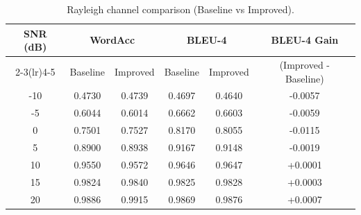 \begin{table}[htbp]
\centering
\caption{Rayleigh channel comparison (Baseline vs Improved).}
\begin{tabular}{cccccc}
\toprule
SNR (dB) & \multicolumn{2}{c}{WordAcc} & \multicolumn{2}{c}{BLEU-4} & BLEU-4 Gain \\
\cmidrule(lr){2-3}\cmidrule(lr){4-5}
& Baseline & Improved & Baseline & Improved & (Improved - Baseline) \\
\midrule
-10 & 0.4730 & 0.4739 & 0.4697 & 0.4640 & -0.0057 \\
-5  & 0.6044 & 0.6014 & 0.6662 & 0.6603 & -0.0059 \\
0   & 0.7501 & 0.7527 & 0.8170 & 0.8055 & -0.0115 \\
5   & 0.8900 & 0.8938 & 0.9167 & 0.9148 & -0.0019 \\
10  & 0.9550 & 0.9572 & 0.9646 & 0.9647 & +0.0001 \\
15  & 0.9824 & 0.9840 & 0.9825 & 0.9828 & +0.0003 \\
20  & 0.9886 & 0.9915 & 0.9869 & 0.9876 & +0.0007 \\
\bottomrule
\end{tabular}
\label{tab:rayleigh}
\end{table}

